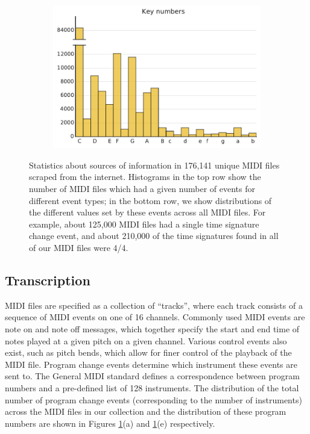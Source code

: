 \documentclass{article}
\begin{document}
\begin{figure}
\begin{subfigure}{.23\textwidth}
    \end{subfigure}
    \begin{subfigure}{.23\textwidth}
        \includegraphics[width=\textwidth]{keys.pdf}
    \end{subfigure}
    \caption{Statistics about sources of information in 176,141 unique MIDI files scraped from the internet.
    Histograms in the top row show the number of MIDI files which had a given number of events for different event types; in the bottom row, we show distributions of the different values set by these events across all MIDI files.
    For example, about 125,000 MIDI files had a single time signature change event, and about 210,000 of the time signatures found in all of our MIDI files were 4/4.}
    \label{fig:statistics}
\end{figure}

\subsection{Transcription}

MIDI files are specified as a collection of ``tracks'', where each track consists of a sequence of MIDI events on one of 16 channels.
Commonly used MIDI events are note on and note off messages, which together specify the start and end time of notes played at a given pitch on a given channel.
Various control events also exist, such as pitch bends, which allow for finer control of the playback of the MIDI file.
Program change events determine which instrument these events are sent to.
The General MIDI standard defines a correspondence between program numbers and a pre-defined list of 128 instruments.
The distribution of the total number of program change events (corresponding to the number of instruments) across the MIDI files in our collection and the distribution of these program numbers are shown in Figures \ref{fig:statistics}(a) and \ref{fig:statistics}(e) respectively.
\end{document}
